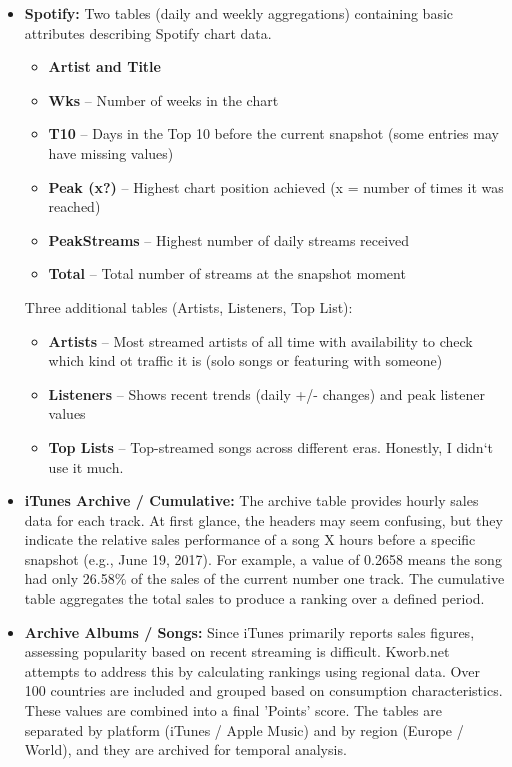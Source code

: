 \documentclass{article}
\begin{document}
\begin{itemize}
    \item \textbf{Spotify:} Two tables (daily and weekly aggregations) containing basic attributes describing Spotify chart data.
    \begin{itemize}
        \item \textbf{Artist and Title}
        \item \textbf{Wks} – Number of weeks in the chart
        \item \textbf{T10} – Days in the Top 10 before the current snapshot (some entries may have missing values)
        \item \textbf{Peak (x?)} – Highest chart position achieved (x = number of times it was reached)
        \item \textbf{PeakStreams} – Highest number of daily streams received
        \item \textbf{Total} – Total number of streams at the snapshot moment
    \end{itemize}
    Three additional tables (Artists, Listeners, Top List):
    \begin{itemize}
        \item \textbf{Artists} – Most streamed artists of all time with availability to check which kind ot traffic it is (solo songs or featuring with someone)
        \item \textbf{Listeners} – Shows recent trends (daily +/- changes) and peak listener values
        \item \textbf{Top Lists} – Top-streamed songs across different eras. Honestly, I didn`t use it much.
    \end{itemize}
    
    \item \textbf{iTunes Archive / Cumulative:}  
    The archive table provides hourly sales data for each track. At first glance, the headers may seem confusing, but they indicate the relative sales performance of a song X hours before a specific snapshot (e.g., June 19, 2017). For example, a value of 0.2658 means the song had only 26.58\% of the sales of the current number one track. The cumulative table aggregates the total sales to produce a ranking over a defined period.
    
    \item \textbf{Archive Albums / Songs:}  
    Since iTunes primarily reports sales figures, assessing popularity based on recent streaming is difficult. Kworb.net attempts to address this by calculating rankings using regional data. Over 100 countries are included and grouped based on consumption characteristics. These values are combined into a final 'Points' score. The tables are separated by platform (iTunes / Apple Music) and by region (Europe / World), and they are archived for temporal analysis.


\end{itemize}
\end{document}
